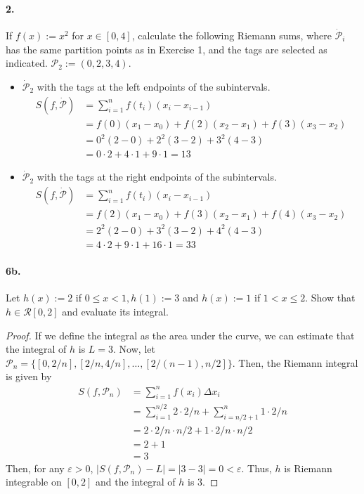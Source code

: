 \documentclass[12pt]{article}
\theoremstyle{remark}
\begin{document}
\paragraph{2.} If $f(x):=x^2$ for $x \in[0,4]$, calculate the following Riemann sums, where $\dot{\mathcal{P}}_i$ has the same partition points as in Exercise 1, and the tags are selected as indicated. $\mathcal{P}_2 := (0, 2, 3, 4)$.
\begin{itemize}
    \item $\dot{\mathcal{P}}_2$ with the tags at the left endpoints of the subintervals.
    \begin{align*} 
        S(f, \dot{\mathcal{P}}) &=\sum_{i=1}^n f\left(t_i\right)\left(x_i-x_{i-1}\right) \\
        &=f(0)\left(x_1-x_0\right)+f(2)\left(x_2-x_1\right)+f(3)\left(x_3-x_2\right) \\
        &=0^2(2-0)+2^2(3-2)+3^2(4-3) \\
        &=0 \cdot 2+4 \cdot 1+9 \cdot 1=13 
    \end{align*}
    \item $\dot{\mathcal{P}}_2$ with the tags at the right endpoints of the subintervals.
    \begin{align*}
        S(f, \dot{\mathcal{P}}) &=\sum_{i=1}^n f\left(t_i\right)\left(x_i-x_{i-1}\right) \\
        &=f(2)\left(x_1-x_0\right)+f(3)\left(x_2-x_1\right)+f(4)\left(x_3-x_2\right) \\
        &=2^2(2-0)+3^2(3-2)+4^2(4-3) \\
        &=4 \cdot 2+9 \cdot 1+16 \cdot 1=33
    \end{align*}
\end{itemize}

\paragraph{6b.} Let $h(x):=2$ if $0 \leq x<1, h(1):=3$ and $h(x):=1$ if $1<x \leq 2$. Show that $h \in \mathcal{R}[0,2]$ and evaluate its integral.
\begin{proof}
    If we define the integral as the area under the curve, we can estimate that the integral of $h$ is $L = 3$. Now, let $\mathcal{P}_n = \{[0, 2/n], [2/n, 4/n], \ldots, [2/(n - 1), n/2] \}$. Then, the Riemann integral is given by
    \begin{align*}
        S(f, \mathcal{P}_n) &= \sum_{i = 1}^n f(x_i) \Delta x_i \\
        &= \sum_{i = 1}^{n/2} 2 \cdot 2/n + \sum_{i = n/2 + 1}^n 1 \cdot 2/n \\
        &= 2 \cdot 2/n \cdot n/2 + 1 \cdot 2/n \cdot n/2 \\
        &= 2 + 1 \\
        &= 3
    \end{align*}
    Then, for any $\varepsilon > 0$, $|S(f, \mathcal{P}_n) - L| = |3 - 3| = 0 < \varepsilon$. Thus, $h$ is Riemann integrable on $[0, 2]$ and the integral of $h$ is $3$.
\end{proof}
\end{document}
